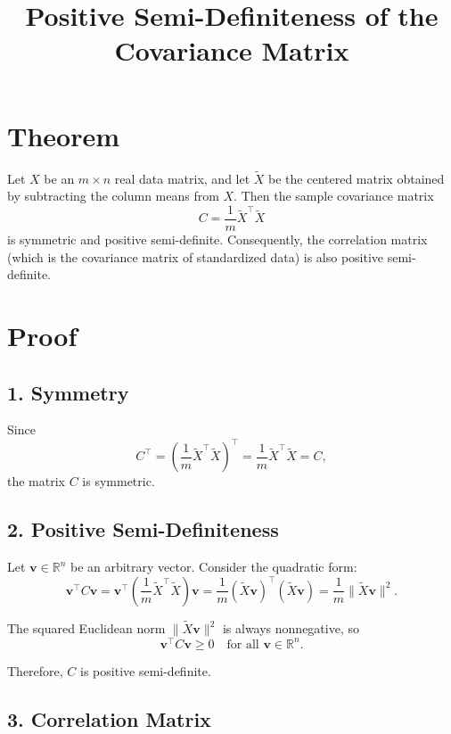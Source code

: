 \documentclass{article}
\title{Positive Semi-Definiteness of the Covariance Matrix}
\author{}
\date{}
\begin{document}
\maketitle

\Large

\section*{Theorem}
Let $X$ be an $m \times n$ real data matrix, and let $\tilde{X}$ be the centered matrix obtained by subtracting the column means from $X$.  
Then the sample covariance matrix
\[
C = \frac{1}{m} \tilde{X}^\top \tilde{X}
\]
is symmetric and positive semi-definite.  
Consequently, the correlation matrix (which is the covariance matrix of standardized data) is also positive semi-definite.

\section*{Proof}

\subsection*{1. Symmetry}

Since
\[
C^\top = \left( \frac{1}{m} \tilde{X}^\top \tilde{X} \right)^\top = \frac{1}{m} \tilde{X}^\top \tilde{X} = C,
\]
the matrix $C$ is symmetric.

\subsection*{2. Positive Semi-Definiteness}

Let $\mathbf{v} \in \mathbb{R}^n$ be an arbitrary vector. Consider the quadratic form:
\[
\mathbf{v}^\top C \mathbf{v} = \mathbf{v}^\top \left( \frac{1}{m} \tilde{X}^\top \tilde{X} \right) \mathbf{v}
= \frac{1}{m} (\tilde{X} \mathbf{v})^\top (\tilde{X} \mathbf{v})
= \frac{1}{m} \| \tilde{X} \mathbf{v} \|^2.
\]

The squared Euclidean norm $\| \tilde{X} \mathbf{v} \|^2$ is always nonnegative, so
\[
\mathbf{v}^\top C \mathbf{v} \geq 0 \quad \text{for all } \mathbf{v} \in \mathbb{R}^n.
\]

Therefore, $C$ is positive semi-definite.

\subsection*{3. Correlation Matrix}
\end{document}
